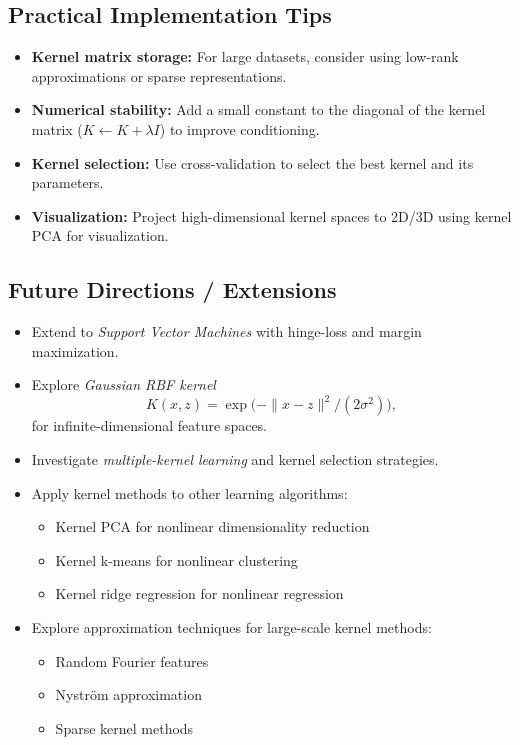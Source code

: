 \documentclass[11pt]{article}
\begin{document}
\subsection{Practical Implementation Tips}
\begin{itemize}
  \item \textbf{Kernel matrix storage:} For large datasets, consider using low-rank approximations or sparse representations.
  \item \textbf{Numerical stability:} Add a small constant to the diagonal of the kernel matrix ($K \leftarrow K + \lambda I$) to improve conditioning.
  \item \textbf{Kernel selection:} Use cross-validation to select the best kernel and its parameters.
  \item \textbf{Visualization:} Project high-dimensional kernel spaces to 2D/3D using kernel PCA for visualization.
\end{itemize}

\subsection{Future Directions / Extensions}
\begin{itemize}
  \item Extend to \emph{Support Vector Machines} with hinge-loss and margin maximization.
  \item Explore \emph{Gaussian RBF kernel} 
  \[
    K(x,z) = \exp\bigl(-\|x-z\|^2/(2\sigma^2)\bigr),
  \]
  for infinite-dimensional feature spaces.
  \item Investigate \emph{multiple-kernel learning} and kernel selection strategies.
  \item Apply kernel methods to other learning algorithms:
    \begin{itemize}
      \item Kernel PCA for nonlinear dimensionality reduction
      \item Kernel k-means for nonlinear clustering
      \item Kernel ridge regression for nonlinear regression
    \end{itemize}
  \item Explore approximation techniques for large-scale kernel methods:
    \begin{itemize}
      \item Random Fourier features
      \item Nyström approximation
      \item Sparse kernel methods
    \end{itemize}
\end{itemize}
\end{document}

